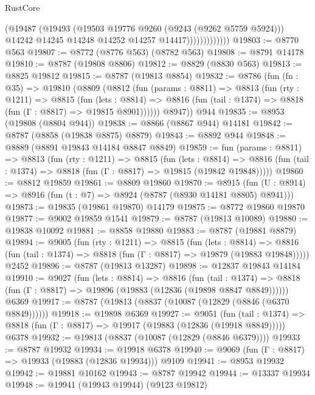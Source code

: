 \begin{lexlean}{RustCore}
\begin{coremodule}
                          (@19487
                            (@19493
                              (@19503 @19776 @9260 (@9243 (@9262 @5759 @5924)))
                              @14242
                              @14245
                              @14248
                              @14252
                              @14257
                              @14417)))))))))))))
@19803 := @8770 @563
@19807 := @8772 (@8776 @563) (@8782 @563)
@19808 := @8791 @14178
@19810 := @8787 (@19808 @8806)
@19812 := @8829 (@8830 @563)
@19813 := @8825 @19812
@19815 := @8787 (@19813 @8854)
@19832 := @8786
    (fun (fn : @35) =>
    @19810
      (@8809
        (@8812
          (fun (params : @8811) =>
          @8813
            (fun (rty : @1211) =>
            @8815
              (fun (lets : @8814) =>
              @8816 (fun (tail : @1374) => @8818 (fun (Γ : @8817) => @19815 @8901))))))
        @8947))
    @944
@19835 := @8953 (@19808 (@8804 @944))
@19838 := @8866 (@8867 @944) @14181
@19842 := @8787 (@8858 (@19838 @8875) @8879)
@19843 := @8892 @944
@19848 := @8889 (@8891 @19843 @14184 @8847 @8849)
@19859 := fun (params : @8811) =>
  @8813
    (fun (rty : @1211) =>
    @8815
      (fun (lets : @8814) =>
      @8816 (fun (tail : @1374) => @8818 (fun (Γ : @8817) => @19815 (@19842 @19848)))))
@19860 := @8812 @19859
@19861 := @8809 @19860
@19870 := @8915
    (fun (U : @8914) => @8916 (fun (t : @7) => @8924 (@8787 (@8930 @14181 @8805) @8941)))
@19873 := @19835 (@19861 @19870) @14179
@19875 := @8772 @19860 @19870
@19877 := @9002 @19859 @1541
@19879 := @8787 (@19813 @10089)
@19880 := @19838 @10092
@19881 := @8858 @19880
@19883 := @8787 (@19881 @8879)
@19894 := @9005
    (fun (rty : @1211) =>
    @8815
      (fun (lets : @8814) =>
      @8816 (fun (tail : @1374) => @8818 (fun (Γ : @8817) => @19879 (@19883 @19848)))))
    @2452
@19896 := @8787 (@19813 @13287)
@19898 := @12837 @19843 @14184
@19910 := @9027
    (fun (lets : @8814) =>
    @8816
      (fun (tail : @1374) =>
      @8818 (fun (Γ : @8817) => @19896 (@19883 (@12836 (@19898 @8847 @8849))))))
    @6369
@19917 := @8787 (@19813 (@8837 (@10087 (@12829 (@8846 (@6370 @8849))))))
@19918 := @19898 @6369
@19927 := @9051
    (fun (tail : @1374) => @8818 (fun (Γ : @8817) => @19917 (@19883 (@12836 (@19918 @8849)))))
    @6378
@19932 := @19813 (@8837 (@10087 (@12829 (@8846 @6379))))
@19933 := @8787 @19932
@19934 := @19918 @6378
@19940 := @9069 (fun (Γ : @8817) => @19933 (@19883 (@12836 @19934))) @9109
@19941 := @8953 @19932
@19942 := @19881 @10162
@19943 := @8787 @19942
@19944 := @13337 @19934
@19948 := @19941 (@19943 @19944) (@9123 @19812)

\end{coremodule}
\end{lexlean}
